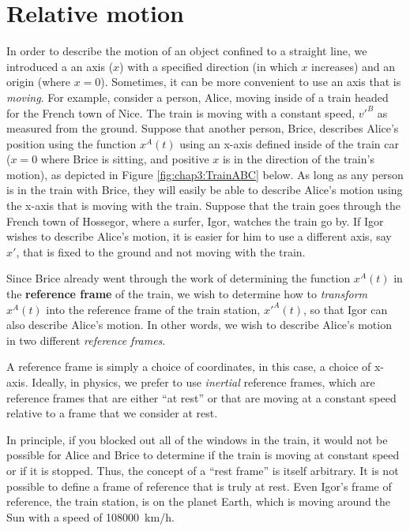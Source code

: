 \section{Relative motion}
In order to describe the motion of an object confined to a straight line, we introduced a an axis ($x$) with a specified direction (in which $x$ increases) and an origin (where $x=0$). Sometimes, it can be more convenient to use an axis that is \textit{moving}. For example, consider a person, Alice, moving inside of a train headed for the French town of Nice. The train is moving with a constant speed, $v'^B$ as measured from the ground. Suppose that another person, Brice, describes Alice's position using the function $x^A(t)$ using an x-axis defined inside of the train car ($x=0$ where Brice is sitting, and positive $x$ is in the direction of the train's motion), as depicted in Figure \ref{fig:chap3:TrainABC} below. As long as any person is in the train with Brice, they will easily be able to describe Alice's motion using the x-axis that is moving with the train. Suppose that the train goes through the French town of Hossegor, where a surfer, Igor, watches the train go by. If Igor wishes to describe Alice's motion, it is easier for him to use a different axis, say $x'$, that is fixed to the ground and not moving with the train. 

Since Brice already went through the work of determining the function $x^A(t)$ in the \textbf{reference frame} of the train, we wish to determine how to \textit{transform} $x^A(t)$ into the reference frame of the train station, $x'^A(t)$, so that Igor can also describe Alice's motion. In other words, we wish to describe Alice's motion in two different \textit{reference frames}.


A reference frame is simply a choice of coordinates, in this case, a choice of x-axis. Ideally, in physics, we prefer to use \textit{inertial} reference frames, which are reference frames that are either ``at rest'' or that are moving at a constant speed relative to a frame that we consider at rest.
 
 
In principle, if you blocked out all of the windows in the train, it would not be possible for Alice and Brice to determine if the train is moving at constant speed or if it is stopped. Thus, the concept of a ``rest frame'' is itself arbitrary. It is not possible to define a frame of reference that is truly at rest. Even Igor's frame of reference, the train station, is on the planet Earth, which is moving around the Sun with a speed of \SI{108000}{km/h}.


